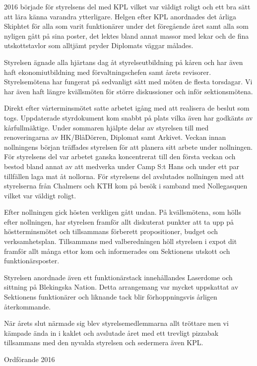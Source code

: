 \documentclass[../_main/handlingar.tex]{subfiles}
\begin{document}
2016 började för styrelsens del med KPL vilket var väldigt roligt och ett bra sätt att lära känna varandra ytterligare. Helgen efter KPL anordnades det årliga Skiphtet för alla som varit funktionärer under det föregående året samt alla som nyligen gått på sina poster, det lektes bland annat massor med lekar och de fina utskottstavlor som alltjämt pryder Diplomats väggar målades.

Styrelsen ägnade alla hjärtans dag åt styrelseutbildning på kåren och har även haft ekonomiutbildning med förvaltningschefen samt årets revisorer. Styrelsemötena har fungerat på sedvanligt sätt med möten de flesta torsdagar. Vi har även haft längre kvällsmöten för större diskussioner och inför sektionsmötena.

Direkt efter vårterminsmötet satte arbetet igång med att realisera de beslut som togs. Uppdaterade styrdokument kom snabbt på plats vilka även har godkänts av kårfullmäktige. Under sommaren hjälpte delar av styrelsen till med renoveringarna av HK/BlåDörren, Diplomat samt Arkivet. Veckan innan nollningens början träffades styrelsen för att planera sitt arbete under nollningen. För styrelsens del var arbetet ganska koncentrerat till den första veckan och bestod bland annat av att medverka under Camp S:t Hans och under ett par tillfällen laga mat åt nollorna. För styrelsens del avslutades nollningen med att styrelserna från Chalmers och KTH kom på besök i samband med Nollegasquen vilket var väldigt roligt.

Efter nollningen gick hösten verkligen gått undan. På kvällsmötena, som hölls efter nollningen, har styrelsen framför allt diskuterat punkter att ta upp på höstterminsmötet och tillsammans förberett propositioner, budget och verksamhetsplan. Tillsammans med valberedningen höll styrelsen i expot dit framför allt många ettor kom och informerades om Sektionens utskott och funktionärsposter.

Styrelsen anordnade även ett funktionärstack innehållandes Laserdome och sittning på Blekingska Nation. Detta arrangemang var mycket uppskattat av Sektionens funktionärer och liknande tack blir förhoppningsvis årligen återkommande.

När årets slut närmade sig blev styrelsemedlemmarna allt tröttare men vi kämpade ända in i kaklet och avslutade året med ett trevligt pizzabak tillsammans med den nyvalda styrelsen och sedermera även KPL.
\begin{signatures}{1}
    \mvh
    \signature{Fredrik Peterson}{Ordförande 2016}
\end{signatures}
\end{document}
